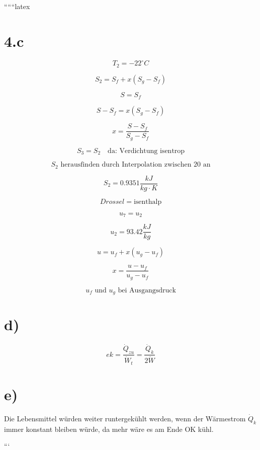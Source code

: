 ``````latex


\section*{4.c}

\[
T_2 = -22^\circ C
\]

\[
S_2 = S_f + x \left( S_{g} - S_{f} \right)
\]

\[
S = S_f
\]

\[
S - S_f = x \left( S_{g} - S_{f} \right)
\]

\[
x = \frac{S - S_f}{S_{g} - S_f}
\]

\[
S_3 = S_2 \quad \text{da: Verdichtung isentrop}
\]

\[
S_2 \text{ herausfinden durch Interpolation zwischen 20 an}
\]

\[
S_2 = 0.9351 \frac{kJ}{kg \cdot K}
\]

\[
Drossel = \text{isenthalp}
\]

\[
u_7 = u_2
\]

\[
u_2 = 93.42 \frac{kJ}{kg}
\]

\[
u = u_f + x \left( u_{g} - u_{f} \right)
\]

\[
x = \frac{u - u_f}{u_{g} - u_f}
\]

\[
u_f \text{ und } u_g \text{ bei Ausgangsdruck}
\]

\section*{d)}

\[
ek = \frac{\dot{Q}_{zu}}{\dot{W}_{t}} = \frac{\dot{Q}_{k}}{2 \dot{W}}
\]

\section*{e)}

Die Lebensmittel würden weiter runtergekühlt werden, wenn der Wärmestrom \(\dot{Q}_{k}\) immer konstant bleiben würde, da mehr wäre es am Ende OK kühl.

```